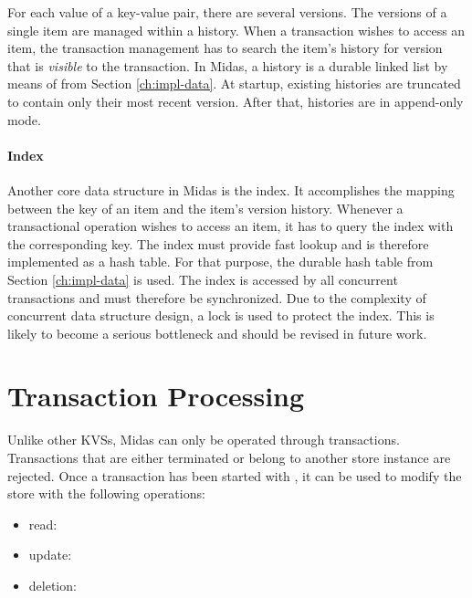 For each value of a key-value pair, there are several versions. The versions of a single item are managed within a history. When a transaction wishes to access an item, the transaction management has to search the item's history for version that is \emph{visible} to the transaction. In Midas, a history is a durable linked list by means of  from Section \ref{ch:impl-data}. At startup, existing histories are truncated to contain only their most recent version. After that, histories are in append-only mode.

\paragraph{Index}

Another core data structure in Midas is the index. It accomplishes the mapping between the key of an item and the item's version history. Whenever a transactional operation wishes to access an item, it has to query the index with the corresponding key. The index must provide fast lookup and is therefore implemented as a hash table. For that purpose, the durable hash table  from Section \ref{ch:impl-data} is used. The index is accessed by all concurrent transactions and must therefore be synchronized. Due to the complexity of concurrent data structure design, a lock is used to protect the index. This is likely to become a serious bottleneck and should be revised in future work.


\section{Transaction Processing}

Unlike other \acp{KVS}, Midas can only be operated through transactions. Transactions that are either terminated or belong to another store instance are rejected. Once a transaction has been started with , it can be used to modify the store with the following operations:

\begin{itemize}
    \item read: 
    \item update: 
    \item deletion: 
\end{itemize}

